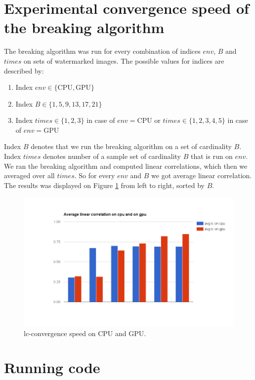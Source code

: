 \documentclass[a4paper,12pt]{article}
\begin{document}
\section{\label{sec:performance}Experimental convergence speed of\\ the breaking algorithm}
The breaking algorithm was run for every combination
of indices $env$, $B$ and $times$ on sets of watermarked images. The possible values for indices are described by:
\begin{enumerate}
  \item Index $env \in \{\text{CPU}, \text{GPU}\}$
  \item Index $B \in \{1, 5, 9, 13, 17, 21\}$
  \item Index $times \in \{1,2,3\}$ in case of $env=\text{CPU}$ or $times \in \{1,2,3,4,5\}$ in case of $env=\text{GPU}$
\end{enumerate}
Index $B$ denotes that we run the breaking algorithm on a set of cardinality $B$.
Index $times$ denotes number of a sample set of cardinality $B$ that is run on
$env$. We ran the breaking algorithm and computed linear correlations, which then
we averaged over all $times$. So for every $env$ and $B$ we got average linear
correlation. The results was displayed on Figure \ref{lc-benchmark} from left
to right, sorted by $B$.

\begin{figure}[ht!]
  \centering
    \includegraphics[width=1.0\textwidth]{../../images/lc-benchmark.png}
  \caption{lc-convergence speed on CPU and GPU.}
  \label{lc-benchmark}
\end{figure}
\section{Running code}
\end{document}

